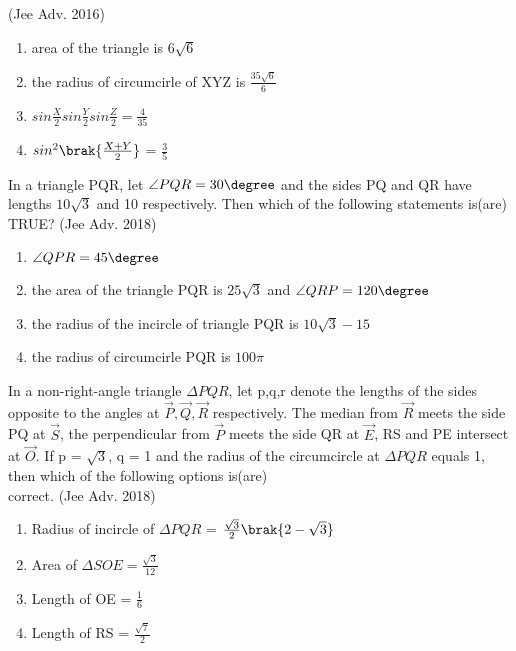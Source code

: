     \hfill{(Jee Adv. 2016)}
    \begin{enumerate}
    \item area of the triangle is 6$\sqrt{6}$
    \item the radius of circumcirle of XYZ is ${\frac{35\sqrt{6}}{6}}$
    \item $sin\frac{X}{2}sin\frac{Y}{2}sin\frac{Z}{2} = \frac{4}{35}$
    \item $sin^{2}\brak{\frac{X+Y}{2}}$ = $\frac{3}{5}$
    \end{enumerate}
    \item In a triangle PQR, let $\angle PQR = 30\degree$ and the sides PQ and QR have lengths $10\sqrt{3}$ and 10 respectively. Then which of the following statements is(are) TRUE?
    \hfill{(Jee Adv. 2018)}
    \begin{enumerate}
    \item $\angle QPR = 45\degree$
    \item the area of the triangle PQR is $25\sqrt{3}$ and $\angle QRP = 120\degree$
    \item the radius of the incircle of triangle PQR is $10\sqrt{3}-15$
    \item the radius of circumcirle PQR is $100\pi$
    \end{enumerate}
    \item In a non-right-angle triangle $\Delta PQR$, let p,q,r denote the lengths of the sides opposite to the angles at $\vec{P},\vec{Q},\vec{R}$ respectively. The median from $\vec{R}$ meets the side PQ at $\vec{S}$, the perpendicular from $\vec{P}$ meets the side QR at $\vec{E}$, RS and PE
	    intersect at $\vec{O}$. If p = $\sqrt{3}$, q = 1 and the radius of the circumcircle at $\Delta PQR$ equals 1, then which of the following options is(are)\\ correct.
    \hfill{(Jee Adv. 2018)}
    \begin{enumerate}
    \item Radius of incircle of $\Delta PQR$ = $\frac{\sqrt{3}}{2}\brak{2-\sqrt{3}}$
    \item Area of $\Delta SOE = \frac{\sqrt{3}}{12}$
    \item Length of OE = $\frac{1}{6}$
    \item Length of RS = $\frac{\sqrt{7}}{2}$
    \end{enumerate}


